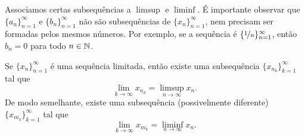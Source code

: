 Associamos certas subsequências a $\limsup$ e $\liminf$.
É importante observar que $\{ a_n \}_{n=1}^\infty$ e
$\{ b_n \}_{n=1}^\infty$ não são
subsequências de $\{ x_n \}_{n=1}^\infty$, nem precisam
ser formadas pelos mesmos números.
Por exemplo, se a sequência é $\{ \nicefrac{1}{n} \}_{n=1}^\infty$, então
$b_n = 0$ para todo $n \in {\mathbb{N}}$.

\begin{thm} \label{subseqlimsupinf:thm}
Se $\{ x_n \}_{n=1}^\infty$ é uma sequência limitada, então existe uma subsequência
$\{ x_{n_k} \}_{k=1}^\infty$ tal que
\begin{equation*}
\lim_{k\to \infty} x_{n_k} = \limsup_{n \to \infty} x_n .
\end{equation*}
De modo semelhante, existe uma subsequência (possivelmente diferente)
$\{ x_{m_k} \}_{k=1}^\infty$ tal que
\begin{equation*}
\lim_{k\to \infty} x_{m_k} = \liminf_{n \to \infty} x_n .
\end{equation*}
\end{thm}

